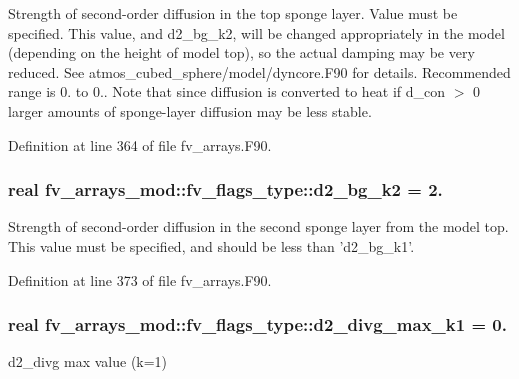 Strength of second-\/order diffusion in the top sponge layer. Value must be specified. This value, and d2\-\_\-bg\-\_\-k2, will be changed appropriately in the model (depending on the height of model top), so the actual damping may be very reduced. See atmos\-\_\-cubed\-\_\-sphere/model/dyncore.\-F90 for details. Recommended range is 0. to 0.. Note that since diffusion is converted to heat if d\-\_\-con $>$ 0 larger amounts of sponge-\/layer diffusion may be less stable. 



Definition at line 364 of file fv\-\_\-arrays.\-F90.

\subsubsection[{d2\-\_\-bg\-\_\-k2}]{\setlength{\rightskip}{0pt plus 5cm}real fv\-\_\-arrays\-\_\-mod\-::fv\-\_\-flags\-\_\-type\-::d2\-\_\-bg\-\_\-k2 = 2.}\label{structfv__arrays__mod_1_1fv__flags__type_a2c3e75d400dd64212d1b1b7a22dfa0ce}


Strength of second-\/order diffusion in the second sponge layer from the model top. This value must be specified, and should be less than 'd2\-\_\-bg\-\_\-k1'. 



Definition at line 373 of file fv\-\_\-arrays.\-F90.

\subsubsection[{d2\-\_\-divg\-\_\-max\-\_\-k1}]{\setlength{\rightskip}{0pt plus 5cm}real fv\-\_\-arrays\-\_\-mod\-::fv\-\_\-flags\-\_\-type\-::d2\-\_\-divg\-\_\-max\-\_\-k1 = 0.}\label{structfv__arrays__mod_1_1fv__flags__type_a22e01e2b95246dc8477bab2b3b162399}


d2\-\_\-divg max value (k=1) 



